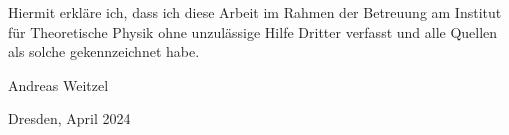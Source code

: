 	\clearpage
	\thispagestyle{empty}
	\vspace*{1.5em}
	
	Hiermit erkläre ich, dass ich diese Arbeit im Rahmen der Betreuung am Institut
	für Theoretische Physik ohne unzulässige Hilfe Dritter verfasst und alle Quellen als solche gekennzeichnet habe.
	
	\vspace*{45em}
	
	Andreas Weitzel \par
	Dresden, April 2024
	

